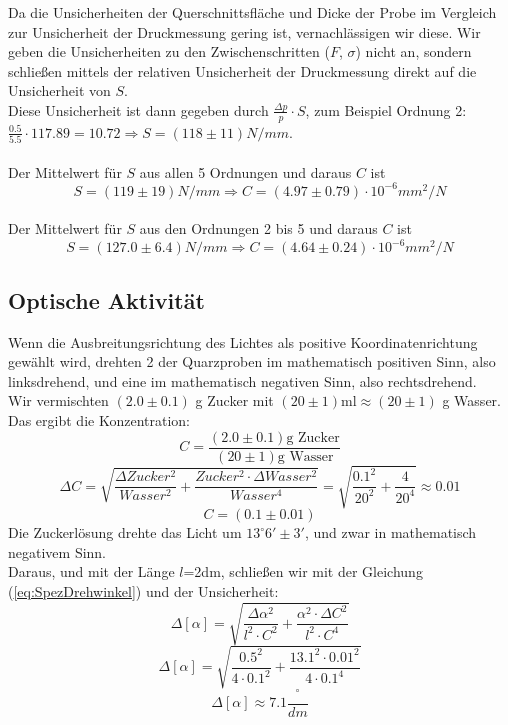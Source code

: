 \documentclass[twoside]{article}
\begin{document}
Da die Unsicherheiten der Querschnittsfläche und Dicke der Probe im Vergleich zur Unsicherheit der Druckmessung gering ist, vernachlässigen wir diese. Wir geben die Unsicherheiten zu den Zwischenschritten ($F$, $\sigma$) nicht an, sondern schließen mittels der relativen Unsicherheit der Druckmessung direkt auf die Unsicherheit von $S$.\\
Diese Unsicherheit ist dann gegeben durch $\frac{\Delta p}{p} \cdot S$, zum Beispiel Ordnung 2: $\frac{0.5}{5.5} \cdot 117.89=10.72 \Rightarrow S=(118 \pm 11) \si{N/mm}$.\\
\\
Der Mittelwert für $S$ aus allen 5 Ordnungen und daraus $C$ ist
$$S=(119 \pm 19)\si{N/mm} \Rightarrow C=(4.97 \pm 0.79) \cdot 10^{-6}\si{mm^2/N}$$
\\
Der Mittelwert für $S$ aus den Ordnungen 2 bis 5 und daraus $C$ ist
$$\boxed{S=(127.0 \pm 6.4)\si{N/mm} \Rightarrow C=(4.64 \pm 0.24) \cdot 10^{-6}\si{mm^2/N}}$$

\subsection{Optische Aktivität}
Wenn die Ausbreitungsrichtung des Lichtes als positive Koordinatenrichtung gewählt wird, drehten 2 der Quarzproben im mathematisch positiven Sinn, also linksdrehend, und eine im mathematisch negativen Sinn, also rechtsdrehend.\\
Wir vermischten $(2.0 \pm 0.1)$ g Zucker mit $(20 \pm 1)\text{ml} \approx (20 \pm 1)$ g Wasser. Das ergibt die Konzentration:
$$C=\frac{(2.0 \pm 0.1) \text{g Zucker}}{(20 \pm 1) \text{g Wasser}}$$
$$\Delta C= \sqrt{\frac{\Delta Zucker^2}{Wasser^2}+\frac{Zucker^2 \cdot \Delta Wasser^2}{Wasser^4}} = \sqrt{\frac{0.1^2}{20^2}+\frac{4}{20^4}}\approx 0.01$$
\vspace{0.5cm}
$$C=(0.1\pm0.01)$$
Die Zuckerlösung drehte das Licht um $13^\circ 6' \pm 3'$, und zwar in mathematisch negativem Sinn. \\
Daraus, und mit der Länge $l$=2dm, schließen wir mit der Gleichung (\ref{eq:SpezDrehwinkel}) und der Unsicherheit:
$$\Delta [\alpha] = \sqrt{\frac{\Delta \alpha^2}{l^2\cdot C^2}+\frac{\alpha^2 \cdot \Delta C ^2}{l^2\cdot C^4}}$$
$$\Delta [\alpha] = \sqrt{\frac{0.5^2}{4\cdot 0.1^2}+\frac{13.1^2\cdot 0.01^2}{4 \cdot 0.1^4}}$$
$$\Delta [\alpha] \approx 7.1 \frac{^\circ}{dm}$$

\begin{center}
\end{center}
\end{document}
